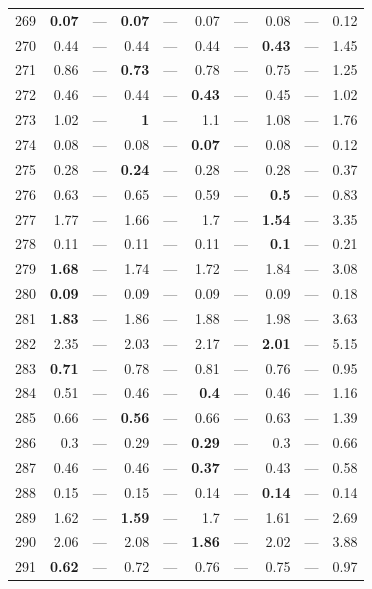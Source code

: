 \begin{longtable}{lr@{\hskip 4pt}l@{\hskip 12pt}r@{\hskip 4pt}l@{\hskip 12pt}r@{\hskip 4pt}l@{\hskip 12pt}r@{\hskip 4pt}l@{\hskip 12pt}r}
269 & \textbf{0.07} & --- & \textbf{0.07} & --- & 0.07 & --- & 0.08 & --- & 0.12 \\
270 & 0.44 & --- & 0.44 & --- & 0.44 & --- & \textbf{0.43} & --- & 1.45 \\
271 & 0.86 & --- & \textbf{0.73} & --- & 0.78 & --- & 0.75 & --- & 1.25 \\
272 & 0.46 & --- & 0.44 & --- & \textbf{0.43} & --- & 0.45 & --- & 1.02 \\
273 & 1.02 & --- & \textbf{1} & --- & 1.1 & --- & 1.08 & --- & 1.76 \\
274 & 0.08 & --- & 0.08 & --- & \textbf{0.07} & --- & 0.08 & --- & 0.12 \\
275 & 0.28 & --- & \textbf{0.24} & --- & 0.28 & --- & 0.28 & --- & 0.37 \\
276 & 0.63 & --- & 0.65 & --- & 0.59 & --- & \textbf{0.5} & --- & 0.83 \\
277 & 1.77 & --- & 1.66 & --- & 1.7 & --- & \textbf{1.54} & --- & 3.35 \\
278 & 0.11 & --- & 0.11 & --- & 0.11 & --- & \textbf{0.1} & --- & 0.21 \\
279 & \textbf{1.68} & --- & 1.74 & --- & 1.72 & --- & 1.84 & --- & 3.08 \\
280 & \textbf{0.09} & --- & 0.09 & --- & 0.09 & --- & 0.09 & --- & 0.18 \\
281 & \textbf{1.83} & --- & 1.86 & --- & 1.88 & --- & 1.98 & --- & 3.63 \\
282 & 2.35 & --- & 2.03 & --- & 2.17 & --- & \textbf{2.01} & --- & 5.15 \\
283 & \textbf{0.71} & --- & 0.78 & --- & 0.81 & --- & 0.76 & --- & 0.95 \\
284 & 0.51 & --- & 0.46 & --- & \textbf{0.4} & --- & 0.46 & --- & 1.16 \\
285 & 0.66 & --- & \textbf{0.56} & --- & 0.66 & --- & 0.63 & --- & 1.39 \\
286 & 0.3 & --- & 0.29 & --- & \textbf{0.29} & --- & 0.3 & --- & 0.66 \\
287 & 0.46 & --- & 0.46 & --- & \textbf{0.37} & --- & 0.43 & --- & 0.58 \\
288 & 0.15 & --- & 0.15 & --- & 0.14 & --- & \textbf{0.14} & --- & 0.14 \\
289 & 1.62 & --- & \textbf{1.59} & --- & 1.7 & --- & 1.61 & --- & 2.69 \\
290 & 2.06 & --- & 2.08 & --- & \textbf{1.86} & --- & 2.02 & --- & 3.88 \\
291 & \textbf{0.62} & --- & 0.72 & --- & 0.76 & --- & 0.75 & --- & 0.97 \\

\end{longtable}
